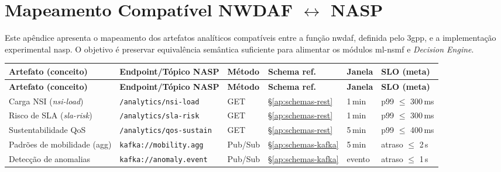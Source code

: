 \chapter{Mapeamento Compatível NWDAF $\leftrightarrow$ NASP}
\label{ap:nwdaf-nasp}

Este apêndice apresenta o mapeamento dos artefatos analíticos compatíveis entre a função \ac{nwdaf}, definida pelo \ac{3gpp}, e a implementação experimental \ac{nasp}.  
O objetivo é preservar equivalência semântica suficiente para alimentar os módulos \ac{ml-nsmf} e \textit{Decision Engine}.

{\scriptsize
\setlength{\tabcolsep}{3pt}
\begin{longtable}{L{2.8cm} L{3.6cm} L{2.0cm} L{2.3cm} L{1.8cm} L{2.1cm}}
\toprule
\textbf{Artefato (conceito)} & \textbf{Endpoint/Tópico NASP} & \textbf{Método} & \textbf{Schema ref.} & \textbf{Janela} & \textbf{SLO (meta)} \\
\midrule
\endfirsthead
\toprule
\textbf{Artefato (conceito)} & \textbf{Endpoint/Tópico NASP} & \textbf{Método} & \textbf{Schema ref.} & \textbf{Janela} & \textbf{SLO (meta)} \\
\midrule
\endhead
Carga NSI (\textit{nsi-load}) & \texttt{/analytics/nsi-load} & GET & \S\ref{ap:schemas-rest} & 1\,min & p99 $\leq$ 300\,ms \\
Risco de SLA (\textit{sla-risk}) & \texttt{/analytics/sla-risk} & GET & \S\ref{ap:schemas-rest} & 1\,min & p99 $\leq$ 300\,ms \\
Sustentabilidade QoS & \texttt{/analytics/qos-sustain} & GET & \S\ref{ap:schemas-rest} & 5\,min & p99 $\leq$ 400\,ms \\
Padrões de mobilidade (agg) & \texttt{kafka://mobility.agg} & Pub/Sub & \S\ref{ap:schemas-kafka} & 5\,min & atraso $\leq$ 2\,s \\
Detecção de anomalias & \texttt{kafka://anomaly.event} & Pub/Sub & \S\ref{ap:schemas-kafka} & evento & atraso $\leq$ 1\,s \\
\bottomrule
\end{longtable}
}

\FloatBarrier
